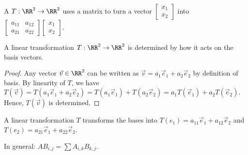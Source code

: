 \documentclass{scrartcl}
\begin{document}
\begin{definition}
	A  $T : \RR^2 \to \RR^2$ uses a matrix to turn
a vector $\begin{bmatrix}x_1 \\ x_2 \end{bmatrix}$ into $\begin{bmatrix}a_{11} & a_{12}
\\ a_{21} & a_{22} \end{bmatrix} \begin{bmatrix}x_1 \\ x_2\end{bmatrix}$. 
\end{definition}

\begin{proposition}
	A linear transformation $T : \RR^2 \to \RR^2$ is determined by how it acts on the basis vectors.
\end{proposition}

\begin{proof}
	Any vector $\vec v \in \RR^2$ can be written as $\vec v = a_1\vec e_1 + a_2\vec e_2$ by definition
	of basis. By linearity of $T$, we have $T(\vec v) = T(a_1 \vec e_1 + a_2 \vec e_2) = 
	T(a_1 \vec e_1) + T(a_2 \vec e_2) = a_1 T(\vec e_1) + a_2 T(\vec e_2)$. Hence, $T(\vec v)$ is 
	determined.
\end{proof}

A linear transformation $T$ transforms the bases into $T(e_1) = a_{11} \vec e_1 + a_{12} \vec e_2$
and $T(e_2) = a_{21} \vec e_1 + a_{22} \vec e_2$.

In general: $AB_{i, j} = \sum A_{i, k} B_{k, j}$.
\end{document}
